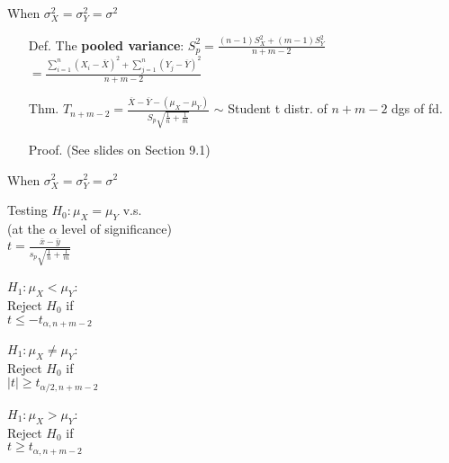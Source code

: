 \begin{frame}{When $\sigma_X^2=\sigma_Y^2 = \sigma^2$}
\begin{itemize}
	\item[Def.] The \textcolor{yellow!80!black}{\bf pooled variance}:
		$\displaystyle S_p^2 =\frac{(n-1)S_X^2+(m-1)S_Y^2}{n+m-2}$\\[2em]
	\hspace{11.5em} $\displaystyle
	= \frac{\sum_{i=1}^n (X_i-\overline{X})^2+ \sum_{j=1}^n (Y_j-\overline{Y})^2 }{n+m-2}$
\vfill
\item[Thm.]
$\displaystyle T_{n+m-2}=\frac{\overline{X}-\overline{Y}-(\mu_X-\mu_Y)}{S_p\sqrt{ \frac{1}{n}+\frac{1}{m} }}$
$\sim$
Student t distr. of $n+m-2$ dgs of fd.
\vfill
\item[Proof.] (See slides on Section 9.1) \myEnd
\end{itemize}
\end{frame}
\begin{frame}{When $\sigma_X^2=\sigma_Y^2 = \sigma^2$}

\centering
Testing $H_0:\mu_X = \mu_Y$ v.s.\\[1em]
(at the $\alpha$ level of significance)
\\[1em]
$\displaystyle t=\frac{\bar{x}-\bar{y}}{s_p\sqrt{ \frac{1}{n}+\frac{1}{m} }}$
\vfill

\begin{minipage}{0.32\textwidth}
\centering
$H_1:\mu_X <\mu_Y$:\\[1em]
Reject $H_0$ if \\[1em]
$t \le -t_{\alpha,n+m-2}$
\end{minipage}
\begin{minipage}{0.32\textwidth}
\centering
$H_1:\mu_X \ne \mu_Y$:\\[1em]
Reject $H_0$ if \\[1em]
$|t| \ge t_{\alpha/2,n+m-2}$
\end{minipage}
\begin{minipage}{0.32\textwidth}
\centering
$H_1:\mu_X>\mu_Y$:\\[1em]
Reject $H_0$ if \\[1em]
$t \ge t_{\alpha,n+m-2}$
\end{minipage}
\end{frame}
